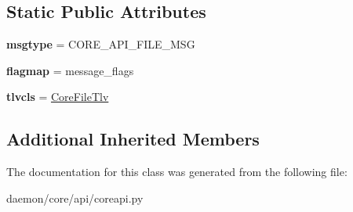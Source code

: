 \subsection*{Static Public Attributes}
\begin{DoxyCompactItemize}
\item 
\hypertarget{classcore_1_1api_1_1coreapi_1_1_core_file_message_ad9d9c4a8cf738e8d534a9c81f8b10f57}{{\bfseries msgtype} = C\+O\+R\+E\+\_\+\+A\+P\+I\+\_\+\+F\+I\+L\+E\+\_\+\+M\+S\+G}\label{classcore_1_1api_1_1coreapi_1_1_core_file_message_ad9d9c4a8cf738e8d534a9c81f8b10f57}

\item 
\hypertarget{classcore_1_1api_1_1coreapi_1_1_core_file_message_a31e9a5baeb7162ca65b9a2248c648c85}{{\bfseries flagmap} = message\+\_\+flags}\label{classcore_1_1api_1_1coreapi_1_1_core_file_message_a31e9a5baeb7162ca65b9a2248c648c85}

\item 
\hypertarget{classcore_1_1api_1_1coreapi_1_1_core_file_message_a1d23065935dc1d5bfcd3f8aaf227b4df}{{\bfseries tlvcls} = \hyperlink{classcore_1_1api_1_1coreapi_1_1_core_file_tlv}{Core\+File\+Tlv}}\label{classcore_1_1api_1_1coreapi_1_1_core_file_message_a1d23065935dc1d5bfcd3f8aaf227b4df}

\end{DoxyCompactItemize}
\subsection*{Additional Inherited Members}


The documentation for this class was generated from the following file\+:\begin{DoxyCompactItemize}
\item 
daemon/core/api/coreapi.\+py\end{DoxyCompactItemize}
